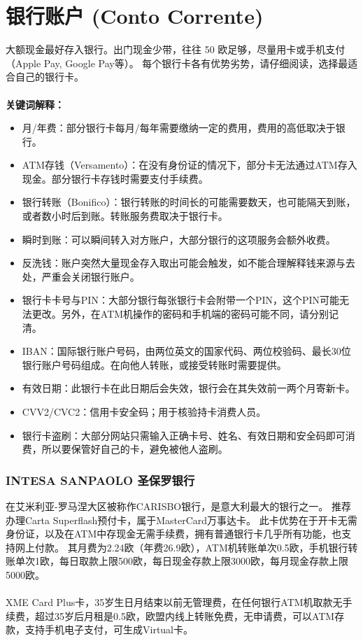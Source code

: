 \section{银行账户 (Conto Corrente)}

大额现金最好存入银行。出门现金少带，往往 50 欧足够，尽量用卡或手机支付（Apple Pay, Google Pay等）。
每个银行卡各有优势劣势，请仔细阅读，选择最适合自己的银行卡。\\
\\
\textbf{关键词解释：}\\
\begin{itemize}
\item 月/年费：部分银行卡每月/每年需要缴纳一定的费用，费用的高低取决于银行。
\item ATM存钱（Versamento）：在没有身份证的情况下，部分卡无法通过ATM存入现金。部分银行卡存钱时需要支付手续费。
\item 银行转账（Bonifico）：银行转账的时间长的可能需要数天，也可能隔天到账，或者数小时后到账。转账服务费取决于银行卡。
\item 瞬时到账：可以瞬间转入对方账户，大部分银行的这项服务会额外收费。
\item 反洗钱：账户突然大量现金存入取出可能会触发，如不能合理解释钱来源与去处，严重会关闭银行账户。
\item 银行卡卡号与PIN：大部分银行每张银行卡会附带一个PIN，这个PIN可能无法更改。另外，在ATM机操作的密码和手机端的密码可能不同，请分别记清。
\item IBAN：国际银行账户号码，由两位英文的国家代码、两位校验码、最长30位银行账户号码组成。在向他人转账，或接受转账时需要提供。
\item 有效日期：此银行卡在此日期后会失效，银行会在其失效前一两个月寄新卡。
\item CVV2/CVC2：信用卡安全码；用于核验持卡消费人员。
\item 银行卡盗刷：大部分网站只需输入正确卡号、姓名、有效日期和安全码即可消费，所以要保管好自己的卡，避免被他人盗刷。
\end{itemize}

\subsubsection{INTESA SANPAOLO 圣保罗银行}

在艾米利亚-罗马涅大区被称作CARISBO银行，是意大利最大的银行之一。
推荐办理Carta Superflash预付卡，属于MasterCard万事达卡。
此卡优势在于开卡无需身份证，以及在ATM中存现金无需手续费，拥有普通银行卡几乎所有功能，也支持网上付款。
其月费为2.24欧（年费26.9欧），ATM机转账单次0.5欧，手机银行转账单次1欧，每日取款上限500欧，每日现金存款上限3000欧，每月现金存款上限5000欧。\\
\\
XME Card Plus卡，35岁生日月结束以前无管理费，在任何银行ATM机取款无手续费，超过35岁后月租是0.5欧，欧盟内线上转账免费，无申请费，可以ATM存款，支持手机电子支付，可生成Virtual卡。

